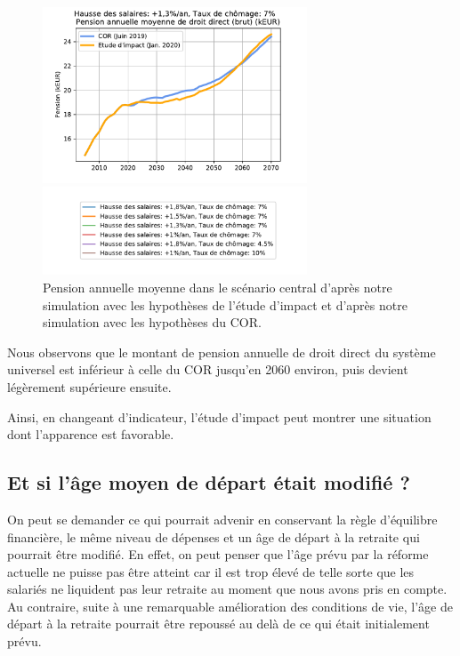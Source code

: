 \documentclass[10pt]{article}
\begin{document}
\begin{figure}
\begin{center}
\includegraphics[width=0.7\textwidth]{Simulation-pension-annuelle-moyenne-3.pdf}

\includegraphics[width=0.7\textwidth]{Simulation-legende.pdf}
\end{center}

\caption{Pension annuelle moyenne dans le scénario central 
d'après notre simulation avec les hypothèses de l'étude d'impact 
et d'après notre simulation avec les hypothèses du COR.}
\label{fig-pension-annuelle-simulation-vs-COR}
\end{figure}

Nous observons que le montant de pension annuelle de droit direct 
du système universel est inférieur à celle du COR jusqu'en 2060 environ, 
puis devient légèrement supérieure ensuite. 

Ainsi, en changeant d'indicateur, l'étude d'impact peut montrer une situation 
dont l'apparence est favorable. 


\subsection{Et si l'âge moyen de départ était modifié ?}

On peut se demander ce qui pourrait 
advenir en conservant la règle d'équilibre financière, le même niveau de dépenses 
et un âge de départ à la retraite qui pourrait être modifié. 
En effet, on peut penser que l'âge prévu par la réforme actuelle 
ne puisse pas être atteint car il est trop élevé de telle sorte que 
les salariés ne liquident pas leur retraite au moment que nous avons 
pris en compte. 
Au contraire, suite à une remarquable amélioration des conditions de vie, 
l'âge de départ à la retraite pourrait être repoussé au delà de ce qui 
était initialement prévu. 
\end{document}
